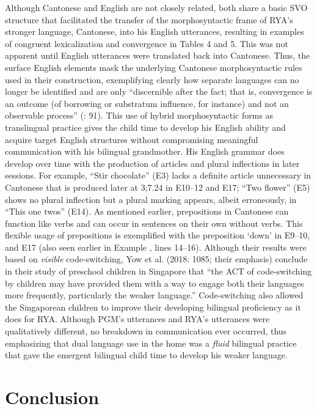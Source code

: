 \documentclass[output=paper,colorlinks,citecolor=brown]{langscibook}
\begin{document}
Although Cantonese and English are not closely related, both share a basic SVO structure that facilitated the transfer of the morphosyntactic frame of RYA’s stronger language, Cantonese, into his English utterances, resulting in examples of congruent lexicalization and convergence in Tables 4 and 5. This was not apparent until English utterances were translated back into Cantonese. Thus, the surface English elements mask the underlying Cantonese morphosyntactic rules used in their construction, exemplifying clearly how separate languages can no longer be identified and are only “discernible after the fact; that is, convergence is an outcome (of borrowing or substratum influence, for instance) and not an observable process” (\citealt{BullockToribio2004}: 91). This use of hybrid morphosyntactic forms as translingual practice gives the child time to develop his English ability and acquire target English structures without compromising meaningful communication with his bilingual grandmother. His English grammar does develop over time with the production of articles and plural inflections in later sessions. For example, “Stir chocolate” (E3) lacks a definite article unnecessary in Cantonese that is produced later at 3;7.24 in E10–12 and E17; “Two flower” (E5) shows no plural inflection but a plural marking appears, albeit erroneously, in “This one twos” (E14). As mentioned earlier, prepositions in Cantonese can function like verbs and can occur in sentences on their own without verbs. This flexible usage of prepositions is exemplified with the preposition ‘down’ in E9–10, and E17 (also seen earlier in Example , lines 14–16). Although their results were based on \textit{visible} code-switching, Yow et al. (2018: 1085; their emphasis) conclude in their study of preschool children in Singapore that “the ACT of code-switching by children may have provided them with a way to engage both their languages more frequently, particularly the weaker language.” Code-switching also allowed the Singaporean children to improve their developing bilingual proficiency as it does for RYA. Although PGM’s utterances and RYA’s utterances were qualitatively different, no breakdown in communication ever occurred, thus emphasizing that dual language use in the home was a \textit{fluid} bilingual practice that gave the emergent bilingual child time to develop his weaker language.

\section{Conclusion}\label{sec:quay:6}
\end{document}
